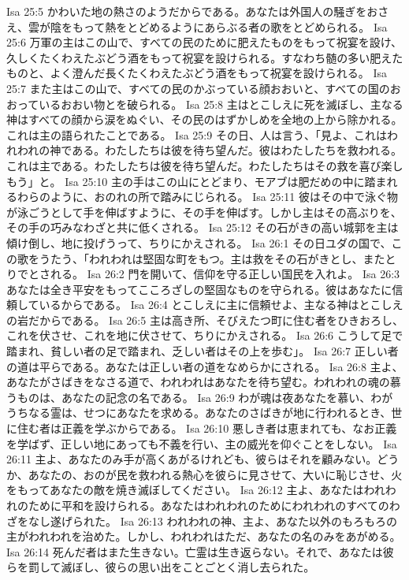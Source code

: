 Isa 25:5  かわいた地の熱さのようだからである。あなたは外国人の騒ぎをおさえ、雲が陰をもって熱をとどめるようにあらぶる者の歌をとどめられる。
Isa 25:6  万軍の主はこの山で、すべての民のために肥えたものをもって祝宴を設け、久しくたくわえたぶどう酒をもって祝宴を設けられる。すなわち髄の多い肥えたものと、よく澄んだ長くたくわえたぶどう酒をもって祝宴を設けられる。
Isa 25:7  また主はこの山で、すべての民のかぶっている顔おおいと、すべての国のおおっているおおい物とを破られる。
Isa 25:8  主はとこしえに死を滅ぼし、主なる神はすべての顔から涙をぬぐい、その民のはずかしめを全地の上から除かれる。これは主の語られたことである。
Isa 25:9  その日、人は言う、「見よ、これはわれわれの神である。わたしたちは彼を待ち望んだ。彼はわたしたちを救われる。これは主である。わたしたちは彼を待ち望んだ。わたしたちはその救を喜び楽しもう」と。
Isa 25:10  主の手はこの山にとどまり、モアブは肥だめの中に踏まれるわらのように、おのれの所で踏みにじられる。
Isa 25:11  彼はその中で泳ぐ物が泳ごうとして手を伸ばすように、その手を伸ばす。しかし主はその高ぶりを、その手の巧みなわざと共に低くされる。
Isa 25:12  その石がきの高い城郭を主は傾け倒し、地に投げうって、ちりにかえされる。
Isa 26:1  その日ユダの国で、この歌をうたう、「われわれは堅固な町をもつ。主は救をその石がきとし、またとりでとされる。
Isa 26:2  門を開いて、信仰を守る正しい国民を入れよ。
Isa 26:3  あなたは全き平安をもってこころざしの堅固なものを守られる。彼はあなたに信頼しているからである。
Isa 26:4  とこしえに主に信頼せよ、主なる神はとこしえの岩だからである。
Isa 26:5  主は高き所、そびえたつ町に住む者をひきおろし、これを伏させ、これを地に伏させて、ちりにかえされる。
Isa 26:6  こうして足で踏まれ、貧しい者の足で踏まれ、乏しい者はその上を歩む」。
Isa 26:7  正しい者の道は平らである。あなたは正しい者の道をなめらかにされる。
Isa 26:8  主よ、あなたがさばきをなさる道で、われわれはあなたを待ち望む。われわれの魂の慕うものは、あなたの記念の名である。
Isa 26:9  わが魂は夜あなたを慕い、わがうちなる霊は、せつにあなたを求める。あなたのさばきが地に行われるとき、世に住む者は正義を学ぶからである。
Isa 26:10  悪しき者は恵まれても、なお正義を学ばず、正しい地にあっても不義を行い、主の威光を仰ぐことをしない。
Isa 26:11  主よ、あなたのみ手が高くあがるけれども、彼らはそれを顧みない。どうか、あなたの、おのが民を救われる熱心を彼らに見させて、大いに恥じさせ、火をもってあなたの敵を焼き滅ぼしてください。
Isa 26:12  主よ、あなたはわれわれのために平和を設けられる。あなたはわれわれのためにわれわれのすべてのわざをなし遂げられた。
Isa 26:13  われわれの神、主よ、あなた以外のもろもろの主がわれわれを治めた。しかし、われわれはただ、あなたの名のみをあがめる。
Isa 26:14  死んだ者はまた生きない。亡霊は生き返らない。それで、あなたは彼らを罰して滅ぼし、彼らの思い出をことごとく消し去られた。
